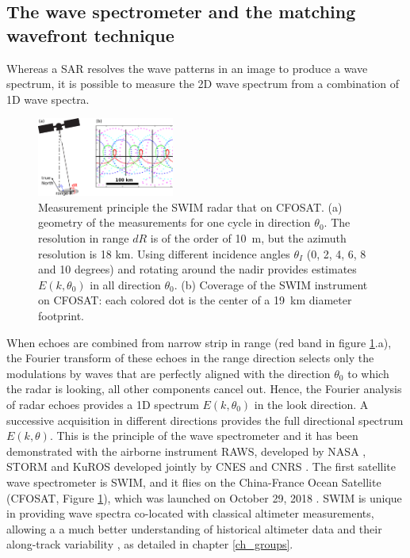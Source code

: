 \subsection{The wave spectrometer and the matching wavefront technique}
Whereas a SAR resolves the wave patterns in an image to produce a wave spectrum, 
it is possible to measure the 2D wave spectrum from a combination of 1D wave spectra. 
\begin{figure}[htb]
\centerline{\includegraphics[width=0.4\textwidth]{FIGS_CH_SAT/CFOSAT_v2.pdf}}
\caption{Measurement principle  the SWIM radar that on CFOSAT. (a) geometry of the measurements for one cycle 
in direction $\theta_0$. The resolution in range $dR$ is of the order of 10~m, but the azimuth resolution is 18 km. Using different incidence angles $\theta_I$ (0, 2, 4, 6, 8 and 10 degrees) 
and rotating around the nadir provides estimates $E(k,\theta_0)$ in all direction $\theta_0$. (b) Coverage of the SWIM instrument on CFOSAT: each colored dot is the center 
of a 19~km diameter footprint.}
\label{CFOSAT}
\end{figure}

When echoes are combined from narrow strip in range (red band in figure 
\ref{CFOSAT}.a), the Fourier transform of these echoes in the range direction selects only the modulations by waves that are perfectly aligned with the direction 
$\theta_0$ to which the radar is looking, all other components cancel out.  Hence, the Fourier analysis of radar echoes provides a 1D spectrum  $E(k,\theta_0)$  
in the look direction. 
A successive acquisition in different directions provides the full directional spectrum $E(k,\theta)$.  
This is the principle of the wave spectrometer and it has been demonstrated with the airborne instrument
RAWS, developed by NASA \citep{Jackson&al.1985}, STORM and KuROS developed jointly by CNES and CNRS \citep{Hauser&al.1992,Caudal&al.2014}.
The first satellite wave spectrometer is SWIM, and it flies on the China-France Ocean Satellite (CFOSAT, Figure \ref{CFOSAT}), which was launched on October 29, 2018 \citep{Hauser&al.2021}. SWIM is unique in providing wave spectra co-located with classical altimeter measurements, allowing a a much better understanding of historical altimeter data and their along-track variability \citep{DeCarlo&al.2023}, as detailed in chapter \ref{ch_groups}. 

